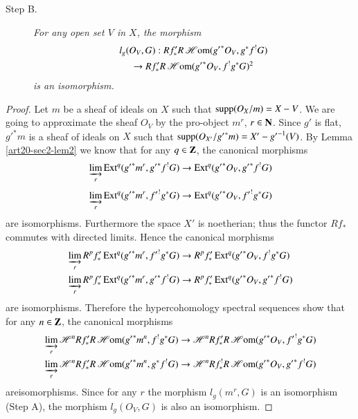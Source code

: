 \begin{description}
\item[Step B.] {\em For any open set $V$ in $X$, the morphism}
\begin{gather*}
l_{g}(O_{V},G):Rf'_{*}R\scrHom({g'}^{*}O_{V},g^{*}f^{!}G)\\
\to Rf'_{*}R\scrHom({g'}^{*}O_{V},f^{!}g^{*}G)\footnotemark[2]
\end{gather*}
{\em is an isomorphism.}
\end{description}

\begin{proof}
Let $m$ be a sheaf of ideals on $X$ such that $\operatorname{\mathrm{supp}}(O_{X}/m)=X-V$. We are going to approximate the sheaf $O_{V}$ by the pro-object $m^{r}$, $r\in \mathbf{N}$. Since $g'$ is flat, ${g'}^{*}m$ is a sheaf of ideals on $X$ such that $\operatorname{\mathrm{supp}}(O_{X'}/{g'}^{*}m)=X'-{g'}^{-1}(V)$. By Lemma \ref{art20-sec2-lem2} we know that for any $q\in \mathbf{Z}$, the canonical morphisms
\begin{align*}
& \varinjlim_{r} \operatorname{\mathrm{Ext}}^{q}({g'}^{*}m^{r},{g'}^{*}f^{!}G)\to \operatorname{\mathrm{Ext}}^{q}({g'}^{*}O_{V},{g'}^{*}f^{!}G)\\[3pt]
& \varinjlim_{r}\operatorname{\mathrm{Ext}}^{q}({g'}^{*}m^{r},{f'}^{!}g^{*}G)\to \operatorname{\mathrm{Ext}}^{q}({g'}^{*}O_{V},{f'}^{!}g^{*}G)
\end{align*}
are isomorphisms. Furthermore the space $X'$ is noetherian; thus the functor $Rf_{*}$ commutes with directed limits. Hence the canonical morphisms
\begin{align*}
&\varinjlim_{r} R^{p}f'_{*}\operatorname{\mathrm{Ext}}^{q}({g'}^{*}m^{r},{f'}^{!}g^{*}G)\to R^{p}f'_{*}\operatorname{\mathrm{Ext}}^{q}({g'}^{*}O_{V},f^{!}g^{*}G)\\
&\varinjlim_{r} R^{p}f'_{*}\operatorname{\mathrm{Ext}}^{q}({g'}^{*}m^{r},{g'}^{*}f^{!}G)\to R^{p}f'_{*}\operatorname{\mathrm{Ext}}^{q}({g'}^{*}O_{V},{g'}^{*}f^{!}G)
\end{align*}
are isomorphisms. Therefore the hypercohomology spectral sequences show that for any $n\in \mathbf{Z}$, the canonical morphisms
\begin{align*}
& \varinjlim_{r}\mathscr{H}^{n}Rf'_{*}R\operatorname{\mathscr{H}\mathrm{om}}({g'}^{*}m^{n},f^{!}g^{*}G)\to \mathscr{H}^{n}Rf'_{*}R\operatorname{\mathscr{H}\mathrm{om}}({g'}^{*}O_{V},{f'}^{!}g^{*}G)\\
&\varinjlim_{r}\mathscr{H}^{n}Rf'_{*}R\operatorname{\mathscr{H}\mathrm{om}}({g'}^{*}m^{n},g^{*}f^{!}G)\to \mathscr{H}^{n}Rf^{!}_{*}R\operatorname{\mathscr{H}\mathrm{om}}({g'}^{*}O_{V},{g'}^{*}f^{!}G)
\end{align*}
are\pageoriginale isomorphisms. Since for any $r$ the morphism $l_{g}(m^{r},G)$ is an isomorphism (Step A), the morphism $l_{g}(O_{V},G)$ is also an isomorphism.
\end{proof}

